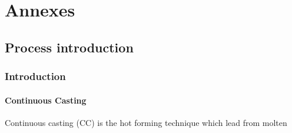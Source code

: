 \newpage
\pagestyle{fancy}


\appendix
\chapter{Annexes}
\section{Process introduction}
\subsection{Introduction}
\subsubsection{Continuous Casting}
Continuous casting (CC) is the hot forming technique which lead from molten 